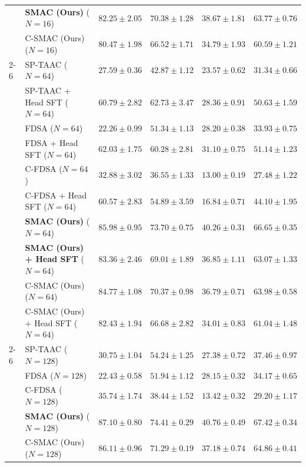 \documentclass{article}
\theoremstyle{plain}
\theoremstyle{definition}
\theoremstyle{remark}
\begin{document}
\begin{table}[!t]
\begin{center}
\begin{scriptsize}
\begin{sc}
\begin{tabular}{llcccc}
                 & \textbf{SMAC (Ours)} ($N = 16$) & \textbf{$82.25 \pm 2.05$} & \textbf{$70.38 \pm 1.28$} & \textbf{$38.67 \pm 1.81$} & \textbf{$63.77 \pm 0.76$} \\
                 & C-SMAC (Ours) ($N = 16$) & $80.47 \pm 1.98$ & $66.52 \pm 1.71$ & $34.79 \pm 1.93$ & $60.59 \pm 1.21$ \\
\cmidrule{2-6}
                 & SP-TAAC ($N = 64$) & $27.59 \pm 0.36$ & $42.87 \pm 1.12$ & $23.57 \pm 0.62$ & $31.34 \pm 0.66$ \\
                 & SP-TAAC + Head SFT ($N = 64$) & $60.79 \pm 2.82$ & $62.73 \pm 3.47$ & $28.36 \pm 0.91$ & $50.63 \pm 1.59$ \\
                 & FDSA ($N = 64$) & $22.26 \pm 0.99$ & $51.34 \pm 1.13$ & $28.20 \pm 0.38$ & $33.93 \pm 0.75$ \\
                 & FDSA + Head SFT ($N = 64$) & $62.03 \pm 1.75$ & $60.28 \pm 2.81$ & $31.10 \pm 0.75$ & $51.14 \pm 1.23$ \\
                 & C-FDSA ($N = 64$) & $32.88 \pm 3.02$ & $36.55 \pm 1.33$ & $13.00 \pm 0.19$ & $27.48 \pm 1.22$ \\
                 & C-FDSA + Head SFT ($N = 64$) & $60.57 \pm 2.83$ & $54.89 \pm 3.59$ & $16.84 \pm 0.71$ & $44.10 \pm 1.95$ \\
                 & \textbf{SMAC (Ours)} ($N = 64$) & \textbf{$85.98 \pm 0.95$} & \textbf{$73.70 \pm 0.75$} & \textbf{$40.26 \pm 0.31$} & \textbf{$66.65 \pm 0.35$} \\
                 & \textbf{SMAC (Ours) + Head SFT} ($N = 64$) & $83.36 \pm 2.46$ & $69.01 \pm 1.89$ & $36.85 \pm 1.11$ & $63.07 \pm 1.33$ \\
                 & C-SMAC (Ours) ($N = 64$) & $84.77 \pm 1.08$ & $70.37 \pm 0.98$ & $36.79 \pm 0.71$ & $63.98 \pm 0.58$ \\
                 & C-SMAC (Ours) + Head SFT ($N = 64$) & $82.43 \pm 1.94$ & $66.68 \pm 2.82$ & $34.01 \pm 0.83$ & $61.04 \pm 1.48$ \\
\cmidrule{2-6}
                 & SP-TAAC ($N = 128$) & $30.75 \pm 1.04$ & $54.24 \pm 1.25$ & $27.38 \pm 0.72$ & $37.46 \pm 0.97$ \\
                 & FDSA ($N = 128$) & $22.43 \pm 0.58$ & $51.94 \pm 1.12$ & $28.15 \pm 0.32$ & $34.17 \pm 0.65$ \\
                 & C-FDSA ($N = 128$) & $35.74 \pm 1.74$ & $38.44 \pm 1.52$ & $13.42 \pm 0.32$ & $29.20 \pm 1.17$ \\
                 & \textbf{SMAC (Ours)} ($N = 128$) & \textbf{$87.10 \pm 0.80$} & \textbf{$74.41 \pm 0.29$} & \textbf{$40.76 \pm 0.49$} & \textbf{$67.42 \pm 0.34$} \\
                 & C-SMAC (Ours) ($N = 128$) & $86.11 \pm 0.96$ & $71.29 \pm 0.19$ & $37.18 \pm 0.74$ & $64.86 \pm 0.41$ \\
\bottomrule
\end{tabular}
\end{sc}
\end{scriptsize}
\end{center}
\vskip -0.1in
\end{table}
\end{document}
